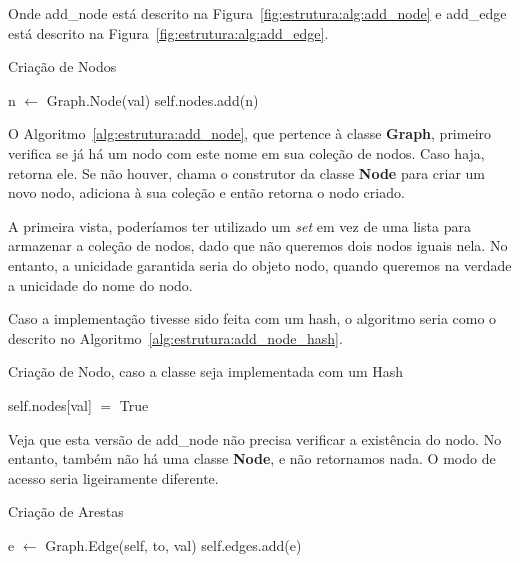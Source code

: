 \documentclass[12pt]{article}
\begin{document}
Onde \textsf{add\_node} está descrito na Figura~\ref{fig:estrutura:alg:add_node}
e \textsf{add\_edge} está descrito na Figura~\ref{fig:estrutura:alg:add_edge}.

\begin{algorithm}[H]
  \caption{Criação de Nodos}
  \label{alg:estrutura:add_node}
  {
    {
       
    }
    n $\gets$ Graph.Node(val) 
    self.nodes.add(n) 
  }
\end{algorithm}

O Algoritmo~\ref{alg:estrutura:add_node},
que pertence à classe \textsf{\textbf{Graph}}, primeiro verifica se já há um
nodo com este nome em sua coleção de nodos. Caso haja, retorna ele. Se não
houver, chama o construtor da classe \textsf{\textbf{Node}} para criar um novo
nodo, adiciona à sua coleção e então retorna o nodo criado.

A primeira vista, poderíamos ter utilizado um \textit{set} em vez de uma lista
para armazenar a coleção de nodos, dado que não queremos dois nodos iguais nela.
No entanto, a unicidade garantida seria do objeto nodo, quando queremos na
verdade a unicidade do nome do nodo.

Caso a implementação tivesse sido feita com um hash, o algoritmo seria como o
descrito no Algoritmo~\ref{alg:estrutura:add_node_hash}.

\begin{algorithm}[H]
  \caption{Criação de Nodo, caso a classe seja implementada com um Hash}
  \label{alg:estrutura:add_node_hash}
  self.nodes[val] $=$ True
\end{algorithm}

Veja que esta versão de \textsf{add\_node} não precisa verificar a existência do
nodo. No entanto, também não há uma classe \textsf{\textbf{Node}}, e não
retornamos nada. O modo de acesso seria ligeiramente diferente.

\begin{algorithm}[H]
  \caption{Criação de Arestas}
  \label{alg:estrutura:add_edge}
  {
    {
       
    }
    e $\gets$ Graph.Edge(self, to, val) 
    self.edges.add(e) 
  }
\end{algorithm}
\end{document}
